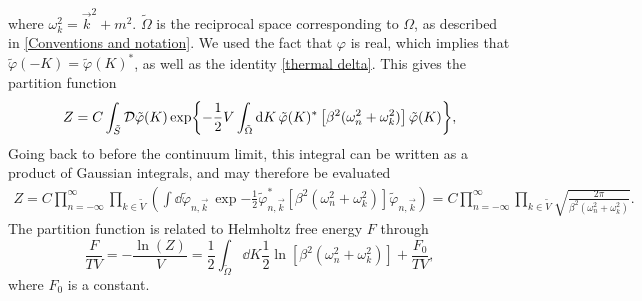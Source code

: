 where $\omega_k^2 = \vec k^2 + m^2$.
$\tilde \Omega$ is the reciprocal space corresponding to $\Omega$, as described in \autoref{Conventions and notation}.
We used the fact that $\varphi$ is real, which implies that $\tilde \varphi(-K) = \tilde \varphi(K)^*$, as well as the identity \autoref{thermal delta}.
This gives the partition function 
\begin{equation}
    Z = C \int_{\tilde S} \mathcal{D} \tilde \varphi(K) 
    \exp{
        -  \frac{1}{2} V \int_{\tilde \Omega} \dd K \, 
        \tilde \varphi(K)^* \left[\beta^2 (\omega_n^2+ \omega_k^2)\right] \tilde \varphi(K)
    },
\end{equation}
Going back to before the continuum limit, this integral can be written as a product of Gaussian integrals, and may therefore be evaluated
\begin{align*}
    Z = C \prod_{n=-\infty}^\infty \prod_{k \in \tilde V}
    \left(
        \int \dd \tilde \varphi_{n, \vec k} \,
        \exp{
            - \frac{1}{2} \tilde \varphi_{n, \vec k}^*
            \left[\beta^2 (\omega_n^2+ \omega_k^2)\right] 
            \tilde \varphi_{n, \vec k}
            }
    \right)
    = 
    C \prod_{n=-\infty}^\infty \prod_{k \in \tilde V} 
    \sqrt{\frac{2 \pi}{\beta^2 (\omega_n^2 + \omega_k^2)}}.
\end{align*}
The partition function is related to Helmholtz free energy $F$ through
\begin{equation}
    \label{result free scalar 1}
    \frac{F}{T V}= - \frac{\ln(Z)}{V} = \frac{1}{2} \int_{\tilde \Omega} \dd K \frac{1}{2} \ln[\beta^2(\omega_n^2 + \omega_k^2)] + \frac{F_0}{TV},
\end{equation}
where $F_0$ is a constant.

